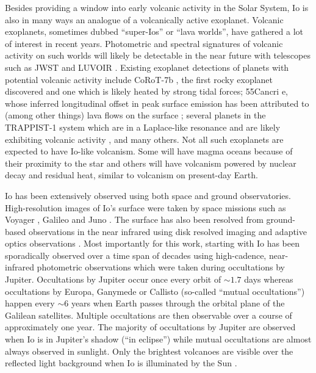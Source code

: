 \documentclass[12pt,dvipsnames]{report}
\begin{document}
Besides providing a window into early volcanic activity in the Solar System, Io is also 
in many ways an analogue of a volcanically active exoplanet.
Volcanic exoplanets, sometimes dubbed ``super-Ios'' or ``lava worlds'', have gathered a
 lot of interest in recent years.
Photometric and spectral signatures of volcanic activity on such worlds will likely be 
detectable in the near future with telescopes such as JWST and LUVOIR 
\citep{2010AJ....140.1370K,arXiv:1804.05110,2019ApJ...885..168O,2021ChEG...81l5735C}.
Existing exoplanet detections of planets with potential volcanic activity include 
CoRoT-7b \citep{2010ApJ...709L..95B}, the first rocky exoplanet discovered and one 
which is likely heated by strong tidal forces; 55Cancri e, whose inferred longitudinal 
offset in peak surface emission has been attributed to (among other things) lava flows 
on the surface \citep{2016MNRAS.455.2018D,2016Natur.532..207D,2017ApJ...849..152H}; 
several planets in the TRAPPIST-1 system which are in a Laplace-like resonance and 
are likely exhibiting volcanic activity \citep{2017NatAs...1..878K,2019A&A...624A...2D}, 
and many others.
Not all such exoplanets are expected to have Io-like volcanism.
Some will have magma oceans because of their proximity to the star and others will have 
volcanism powered by nuclear decay and residual heat, similar to volcanism on present-day Earth.

Io has been extensively observed using both space and ground observatories.
High-resolution images of Io's surface were taken by space missions such as Voyager 
\citep{1979Sci...204..951S}, Galileo \citep{1996Sci...274..377B} and Juno 
\citep{2020Icar..34113607M}.
The surface has also been resolved from ground-based observations in the near 
infrared using disk resolved imaging \citep{1985Sci...230...63H,1986Icar...66..403S,1990Natur.348..618S} 
and adaptive optics observations 
\citep{2000Icar..148..384M,2005Icar..176...96M,2016Icar..280..378D}.
Most importantly for this work,  starting with \citet{1990Natur.348..618S} Io 
has been sporadically observed over a time span of decades using high-cadence, near-infrared
photometric observations which were taken during occultations by Jupiter.
Occultations by Jupiter occur once every orbit of $\sim 1.7$ days whereas occultations 
by Europa, Ganymede or Callisto (so-called ``mutual occultations'') happen every 
$\sim 6$ years when Earth passes through the orbital plane of the Galilean satellites.
Multiple occultations are then observable over a course of approximately one year.
The majority of occultations by Jupiter are observed when Io is in Jupiter's shadow 
(``in eclipse'') while mutual occultations are almost always observed in sunlight.
Only the brightest volcanoes are visible over the reflected light background when Io 
is illuminated by the Sun \citep{1994JGR....9917095V,2016Icar..280..405D}.
\end{document}
